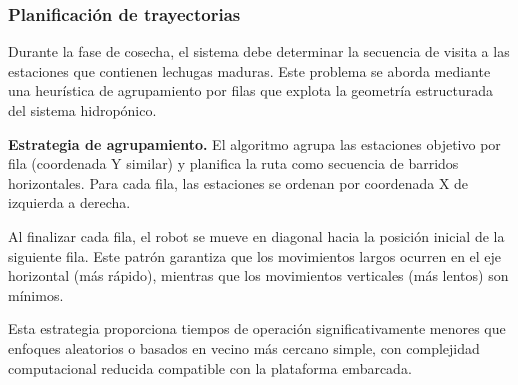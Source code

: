 \subsubsection{Planificación de trayectorias}

Durante la fase de cosecha, el sistema debe determinar la secuencia de visita a las estaciones que contienen lechugas maduras. Este problema se aborda mediante una heurística de agrupamiento por filas que explota la geometría estructurada del sistema hidropónico.

\textbf{Estrategia de agrupamiento.} El algoritmo agrupa las estaciones objetivo por fila (coordenada Y similar) y planifica la ruta como secuencia de barridos horizontales. Para cada fila, las estaciones se ordenan por coordenada X de izquierda a derecha.

Al finalizar cada fila, el robot se mueve en diagonal hacia la posición inicial de la siguiente fila. Este patrón garantiza que los movimientos largos ocurren en el eje horizontal (más rápido), mientras que los movimientos verticales (más lentos) son mínimos.

Esta estrategia proporciona tiempos de operación significativamente menores que enfoques aleatorios o basados en vecino más cercano simple, con complejidad computacional reducida compatible con la plataforma embarcada.
